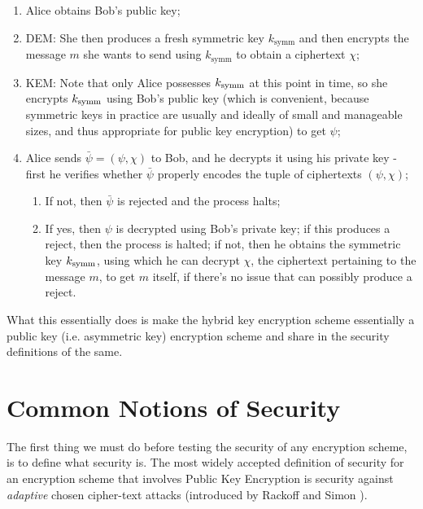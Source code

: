 \begin{enumerate}
    \setlength\itemsep{0.3cm}
    \item Alice obtains Bob's public key;
    \item \textsc{DEM}: She then produces a fresh symmetric key $k_\text{symm}$ and then encrypts the message $m$ she wants to send using $k_\text{symm}$ to obtain a ciphertext $\chi$;
    \item \textsc{KEM}: Note that only Alice possesses $k_{\text{symm}}$ at this point in time, so she encrypts $k_{\text{symm}}$ using Bob's public key (which is convenient, because symmetric keys in practice are usually and ideally of small and manageable sizes, and thus appropriate for public key encryption) to get $\psi$;
    \item Alice sends $\bar\psi=(\psi,\chi)$ to Bob, and he decrypts it using his private key - first he verifies whether $\bar\psi$ properly encodes the tuple of ciphertexts $(\psi,\chi)$;

    \begin{enumerate}
        \item If not, then $\bar\psi$ is rejected and the process halts;
        \item If yes, then $\psi$ is decrypted using Bob's private key; if this produces a reject, then the process is halted; if not, then he obtains the symmetric key $k_{\text{symm}}$, using which he can decrypt $\chi$, the ciphertext pertaining to the message $m$, to get $m$ itself, if there's no issue that can possibly produce a reject.
    \end{enumerate}
\end{enumerate}

What this essentially does is make the hybrid key encryption scheme essentially a public key (i.e. asymmetric key) encryption scheme and share in the security definitions of the same.\\

\section{Common Notions of Security}

The first thing we must do before testing the security of any encryption scheme, is to define what security is. The most widely accepted definition of security for an encryption scheme that involves Public Key Encryption is security against \emph{adaptive} chosen cipher-text attacks \cite{shoup_cca} (introduced by Rackoff and Simon \cite{RS}).

